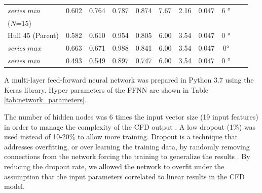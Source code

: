 \documentclass[twoside,twocolumn]{article}
\begin{document}
\begin{table}[b]
\begin{tabular}{p{2.8cm}*{10}{S}}
		\textit{series} $min$     & 0.602 & 0.764 & 0.787 & 0.874  & 7.67  & 2.16  & 0.047   & \ang{6 }       { \bigskip} \\
		\thirdseries ($N$=15)            &       &       &       &        &       &       &         &                    \\ \midrule
		Hull 45 (Parent)               & 0.582 & 0.610 & 0.954 & 0.805  & 6.00  & 3.54  & 0.047   & \ang{0 }                 \\
		\textit{series} $max$     & 0.663 & 0.671 & 0.988 & 0.841  & 6.00  & 3.54  & 0.047   & \ang{0}                  \\
		\textit{series} $min$     & 0.493 & 0.549 & 0.897 & 0.747  & 6.00  & 3.54  & 0.047   & \ang{0 }                 \\ \bottomrule
	\end{tabular}
	\label{tab:DWAsummary}
\end{table}

A multi-layer feed-forward neural network was prepared in Python 3.7 using the Keras library. Hyper parameters of the FFNN are shown in Table \ref{tab:network_parameters}.

\begin{table}[]
\caption{Network hyperparameters used to build the feed forward neural network}
\label{tab:network_parameters}
\end{table}

The number of hidden nodes was 6 times the input vector size (19 input features) in order to manage the complexity of the CFD output \results. A low dropout (1\%) was used instead of 10-20\% to allow more training. Dropout is a technique that addresses overfitting, or over learning the training data, by randomly removing connections from the network forcing the training to generalize the results \cite{Srivastava2014}. By reducing the dropout rate, we allowed the network to overfit under the assumption that the input parameters correlated to linear results in the CFD model.
\end{document}
